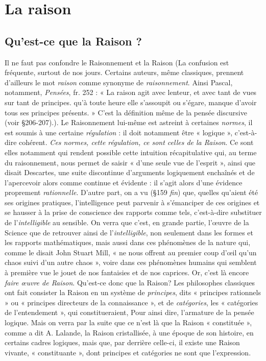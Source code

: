 \chapter{La raison}%


\section{Qu'est-ce que la Raison ?}%
Il ne faut pas confondre le
Raisonnement et la Raison
{\scriptsize (La confusion est fréquente, surtout de nos jours. Certains auteurs, même classiques,
prennent d'ailleurs le mot {\it raison} comme synonyme de {\it raisonnement}. Ainsi Pascal,
notamment, {\it Pensées}, fr. 252 : « La raison agit avec lenteur, et avec tant de vues sur
tant de principes. qu'à toute heure elle s’assoupit ou s’égare, manque d’avoir tous ses
principes présents. » C’est la définition même de la pensée discursive (voir \S 206-207).)}.
Le Raisonnement lui-même est astreint à
certaines {\it normes}, il est soumis à une certaine {\it régulation} : il doit
notamment être « logique », c’est-à-dire cohérent. {\it Ces normes, cette
régulation, ce sont celles de la Raison}. Ce sont elles notamment qui
rendent possible cette intuition récapitulative qui, au terme du raisonnement, nous permet de saisir « d’une seule vue de l'esprit »,
ainsi que disait Descartes, une suite discontinue d’arguments
logiquement enchaînés et de l’apercevoir alors comme continue et
évidente : il s’agit alors d'une évidence proprement {\it rationnelle}.
D'autre part, on a vu (\S 159 {\it fin}) que, quelles qu’aient été ses origines
pratiques, l'intelligence peut parvenir à s’émanciper de ces
origines et se hausser à la prise de conscience des rapports comme
tels, c’est-à-dire substituer de l’{\it intelligible} au sensible. On verra que
c’est, en grande partie, l’œuvre de la Science que de retrouver ainsi
de l’{\it intelligible}, non seulement dans les formes et les rapports mathématiques, mais aussi dans ces phénomènes de la nature qui, comme
le disait John Stuart Mill, « ne nous offrent au premier coup d’œil
qu’un chaos suivi d’un autre chaos », voire dans ces phénomènes
humains qui semblent à première vue le jouet de nos fantaisies et
de nos caprices. Or, c’est là encore {\it faire œuvre de Raison}. Qu’est-ce
donc que la Raison? Les philosophes classiques ont fait consister
la Raison en un système de {\it principes}, dits « principes rationnels »
ou « principes directeurs de la connaissance », et de {\it catégories}, les
« catégories de l’entendement », qui constitueraient, Pour ainsi dire,
l’armature de la pensée logique. Mais on verra par la suite que ce
n’est là que la Raison « constituée », comme a dit A. Lalande, la
Raison cristallisée, à une époque de son histoire, en certains cadres
logiques, mais que, par derrière celle-ci, il existe une Raison vivante,
« constituante », dont principes et catégories ne sont que l'expression.

